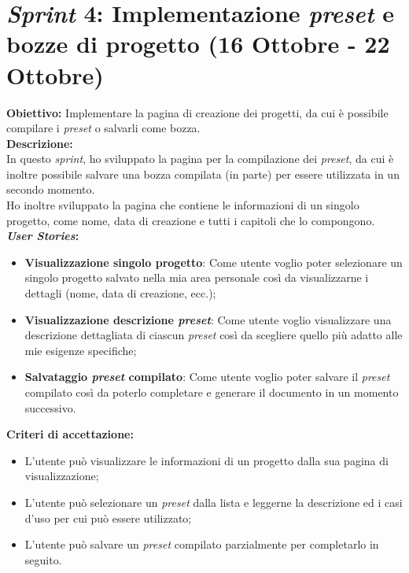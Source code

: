 \section*{\textit{Sprint} 4: Implementazione \textit{preset} e bozze di progetto (16 Ottobre - 22 Ottobre)}
\textbf{Obiettivo:} Implementare la pagina di creazione dei progetti, da cui è possibile compilare i \textit{preset} o salvarli come bozza.\\

\noindent \textbf{Descrizione:}\\
\noindent In questo \textit{sprint}, ho sviluppato la pagina per la compilazione dei \textit{preset}, da cui è inoltre possibile salvare una bozza compilata (in parte) per essere utilizzata in un secondo momento.\\
Ho inoltre sviluppato la pagina che contiene le informazioni di un singolo progetto, come nome, data di creazione e tutti i capitoli che lo compongono.\\  

\noindent \textbf{\textit{User Stories}:} 
\begin{itemize}
    \item \textbf{Visualizzazione singolo progetto}: Come utente voglio poter selezionare un singolo progetto salvato nella mia area personale così da visualizzarne i dettagli (nome, data di creazione, ecc.);
    \item \textbf{Visualizzazione descrizione \textit{preset}}: Come utente voglio visualizzare una descrizione dettagliata di ciascun \textit{preset} così da scegliere quello più adatto alle mie esigenze specifiche;
    \item \textbf{Salvataggio \textit{preset} compilato}: Come utente voglio poter salvare il \textit{preset} compilato così da poterlo completare e generare il documento in un momento successivo.
\end{itemize}

\noindent \textbf{Criteri di accettazione:}  
\begin{itemize}
    \item L’utente può visualizzare le informazioni di un progetto dalla sua pagina di visualizzazione;
    \item L'utente può selezionare un \textit{preset} dalla lista e leggerne la descrizione ed i casi d’uso per cui può essere utilizzato;
    \item L'utente può salvare un \textit{preset} compilato parzialmente per completarlo in seguito.
\end{itemize}

